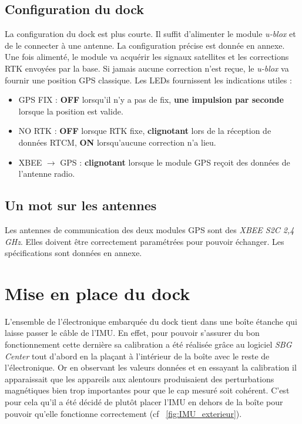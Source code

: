 \documentclass[12pt]{report}
\begin{document}
\subsection{Configuration du dock}
La configuration du dock est plus courte. Il suffit d'alimenter le module \textit{u-blox} et de le connecter à une antenne. La configuration précise est donnée en annexe. Une fois alimenté, le module va acquérir les signaux satellites et les corrections RTK envoyées par la base. 
Si jamais aucune correction n'est reçue, le \textit{u-blox} va fournir une position GPS classique. Les LEDs fournissent les indications utiles : 
\begin{itemize}
    \item GPS FIX : \textbf{OFF} lorsqu'il n'y a pas de fix, \textbf{une impulsion par seconde} lorsque la position est valide.
    \item NO RTK : \textbf{OFF} lorsque RTK fixe, \textbf{clignotant} lors de la réception de données RTCM, \textbf{ON} lorsqu'aucune correction n'a lieu. 
    \item XBEE $\rightarrow$ GPS : \textbf{clignotant} lorsque le module GPS reçoit des données de l'antenne radio.
\end{itemize}

\subsection{Un mot sur les antennes}
Les antennes de communication des deux modules GPS sont des \textit{XBEE S2C 2,4 GHz}. Elles doivent être correctement paramétrées pour pouvoir échanger. 
Les spécifications sont données en annexe.

\section{Mise en place du dock}

L'ensemble de l'électronique embarquée du dock tient dans une boîte étanche qui laisse passer le câble de l'IMU. En effet, pour pouvoir s'assurer du bon fonctionnement cette dernière sa calibration a été réalisée grâce au logiciel \textit{SBG Center} tout d'abord en la plaçant à l'intérieur de la boîte avec le reste de l'électronique. Or en observant les valeurs données et en essayant la calibration il apparaissait que les appareils aux alentours produisaient des perturbations magnétiques bien trop importantes pour que le cap mesuré soit cohérent. C'est pour cela qu'il a été décidé de plutôt placer l'IMU en dehors de la boîte pour pouvoir qu'elle fonctionne correctement (cf ~\ref{fig:IMU_exterieur}).
\end{document}
